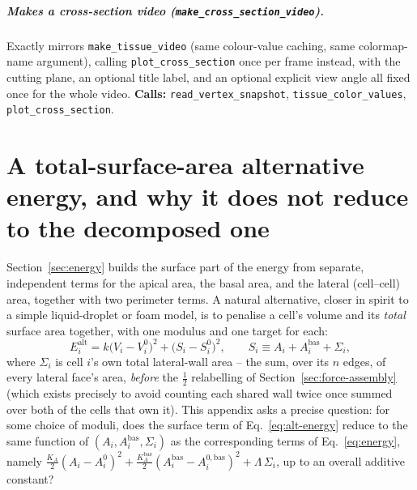 \documentclass[11pt,a4paper]{report}
\begin{document}
\paragraph{Makes a cross-section video (\texttt{make\_cross\_section\_video}).}
Exactly mirrors \texttt{make\_tissue\_video} (same colour-value
caching, same colormap-name argument), calling
\texttt{plot\_cross\_section} once per frame instead, with the cutting
plane, an optional title label, and an optional explicit view angle all
fixed once for the whole video. \textbf{Calls:}
\texttt{read\_vertex\_snapshot}, \texttt{tissue\_color\_values},
\texttt{plot\_cross\_section}.

\appendix

\chapter{A total-surface-area alternative energy, and why it does not reduce to the decomposed one}
\label{app:total-surface}

Section~\ref{sec:energy} builds the surface part of the energy from
separate, independent terms for the apical area, the basal area, and
the lateral (cell--cell) area, together with two perimeter terms. A
natural alternative, closer in spirit to a simple liquid-droplet or
foam model, is to penalise a cell's volume and its \emph{total}
surface area together, with one modulus and one target for each:
\begin{equation}
  E_i^{\mathrm{alt}} = k\bigl(V_i - V_i^0\bigr)^2 + \bigl(S_i - S_i^0\bigr)^2, \qquad
  S_i \equiv A_i + A_i^{\mathrm{bas}} + \Sigma_i,
  \label{eq:alt-energy}
\end{equation}
where $\Sigma_i$ is cell $i$'s own total lateral-wall area -- the sum,
over its $n$ edges, of every lateral face's area, \emph{before} the
$\tfrac12$ relabelling of Section~\ref{sec:force-assembly} (which
exists precisely to avoid counting each shared wall twice once summed
over both of the cells that own it). This appendix asks a precise
question: for some choice of moduli, does the surface term of
Eq.~\eqref{eq:alt-energy} reduce to the same function of
$(A_i,A_i^{\mathrm{bas}},\Sigma_i)$ as the corresponding terms of
Eq.~\eqref{eq:energy}, namely
$\tfrac{K_A}{2}(A_i-A_i^0)^2+\tfrac{K_A^{\mathrm{bas}}}{2}(A_i^{\mathrm{bas}}-A_i^{0,\mathrm{bas}})^2+\Lambda\,\Sigma_i$,
up to an overall additive constant?
\end{document}
